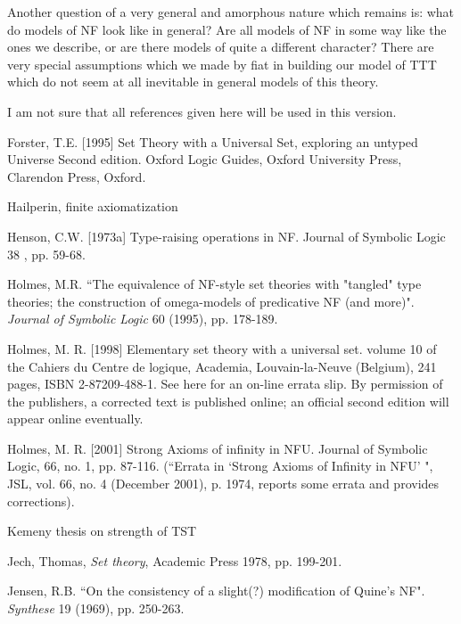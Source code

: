 \documentclass[112pt]{article}
\begin{document}
Another question of a very general and amorphous nature which remains is:  what do models of NF look like in general?  Are all models of NF in some way like the ones we describe, or are there models of quite a different character?  There are very special assumptions which we made by fiat in building our model of TTT which do  not seem at all inevitable in general models of this theory.

\newpage

I am not sure that all references given here will be used in this version.

\begin{thebibliography}{99}





  Forster, T.E. [1995] 
Set Theory with a Universal Set, exploring an untyped Universe 
Second edition. Oxford Logic Guides, Oxford University Press, Clarendon Press, Oxford.

 Hailperin, finite axiomatization

   Henson, C.W. [1973a] 
Type-raising operations in NF. 
Journal of Symbolic Logic 38 , pp. 59-68.

  Holmes, M.R.
``The equivalence of NF-style set theories with "tangled" type theories; the construction of omega-models of predicative NF (and more)". 
{\em Journal of Symbolic Logic\/} 60 (1995), pp. 178-189.

  Holmes, M. R. [1998] 
Elementary set theory with a universal set. 
volume 10 of the Cahiers du Centre de logique, Academia, Louvain-la-Neuve (Belgium), 241 pages, ISBN 2-87209-488-1. See here for an on-line errata slip. By permission of the publishers, a corrected text is published online; an official second edition will appear online eventually.

   Holmes, M. R. [2001]
Strong Axioms of infinity in NFU.
Journal of Symbolic Logic, 66, no. 1, pp. 87-116.  \newline(``Errata in `Strong
Axioms of Infinity in NFU' ", JSL, vol. 66, no. 4 (December
2001), p. 1974, reports some errata and provides corrections).

  Kemeny thesis on strength of TST

  Jech, Thomas, {\em Set theory}, Academic Press 1978, pp. 199-201.

  Jensen, R.B.
``On the consistency of a slight(?) modification of Quine's NF". 
{\em Synthese\/} 19 (1969), pp. 250-263.


\end{thebibliography}
\end{document}
